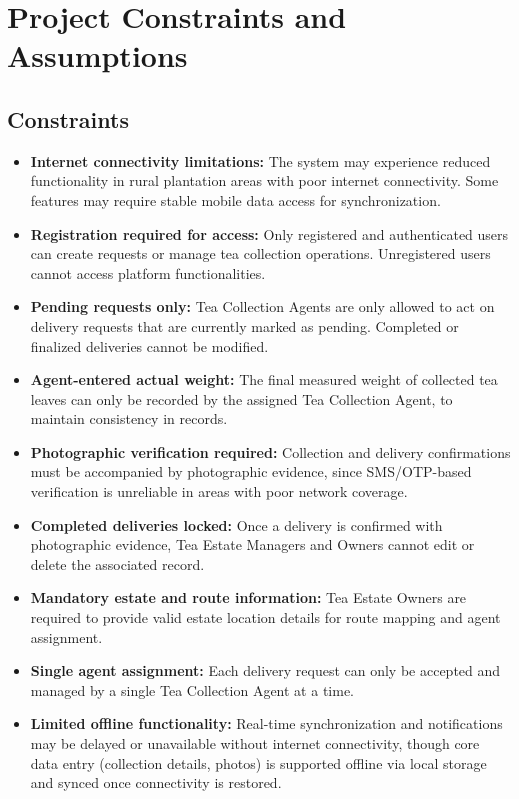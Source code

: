 \section{Project Constraints and Assumptions}
\label{sec:constraints_assumptions}

\subsection{Constraints}
\begin{itemize}
	\item \textbf{Internet connectivity limitations:} The system may experience reduced functionality in rural plantation areas with poor internet connectivity. Some features may require stable mobile data access for synchronization.
	\item \textbf{Registration required for access:} Only registered and authenticated users can create requests or manage tea collection operations. Unregistered users cannot access platform functionalities.
	\item \textbf{Pending requests only:} Tea Collection Agents are only allowed to act on delivery requests that are currently marked as pending. Completed or finalized deliveries cannot be modified.
	\item \textbf{Agent-entered actual weight:} The final measured weight of collected tea leaves can only be recorded by the assigned Tea Collection Agent, to maintain consistency in records.
	\item \textbf{Photographic verification required:} Collection and delivery confirmations must be accompanied by photographic evidence, since SMS/OTP-based verification is unreliable in areas with poor network coverage.
	\item \textbf{Completed deliveries locked:} Once a delivery is confirmed with photographic evidence, Tea Estate Managers and Owners cannot edit or delete the associated record.
	\item \textbf{Mandatory estate and route information:} Tea Estate Owners are required to provide valid estate location details for route mapping and agent assignment.
	\item \textbf{Single agent assignment:} Each delivery request can only be accepted and managed by a single Tea Collection Agent at a time.
	\item \textbf{Limited offline functionality:} Real-time synchronization and notifications may be delayed or unavailable without internet connectivity, though core data entry (collection details, photos) is supported offline via local storage and synced once connectivity is restored.

\end{itemize}
